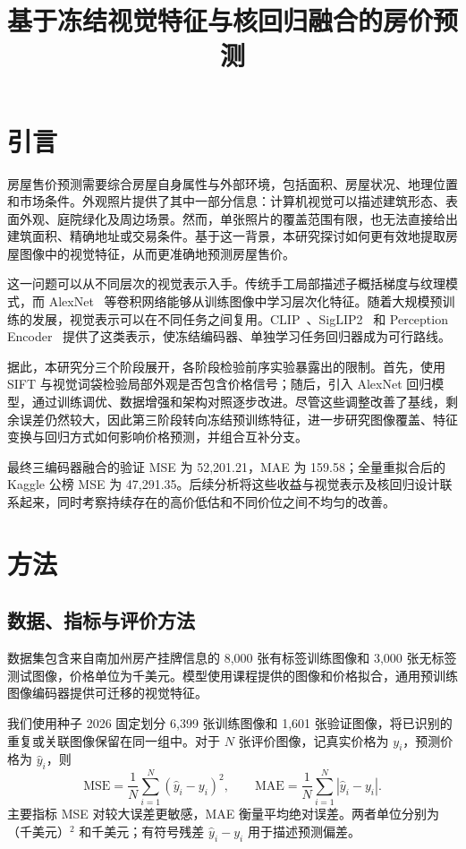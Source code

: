 \documentclass[conference,a4paper]{IEEEtran}
\title{基于冻结视觉特征与核回归融合的房价预测}
\author{\IEEEauthorblockN{Shifeng Chen \qquad Haoxuan Ying}
\IEEEauthorblockA{1686631 \qquad 1255329\\
墨尔本大学，COMP90086 计算机视觉}}
\begin{document}
\maketitle
\raggedbottom

\section{引言}
房屋售价预测需要综合房屋自身属性与外部环境，包括面积、房屋状况、地理位置和市场条件。外观照片提供了其中一部分信息：计算机视觉可以描述建筑形态、表面外观、庭院绿化及周边场景。然而，单张照片的覆盖范围有限，也无法直接给出建筑面积、精确地址或交易条件。基于这一背景，本研究探讨如何更有效地提取房屋图像中的视觉特征，从而更准确地预测房屋售价。

这一问题可以从不同层次的视觉表示入手。传统手工局部描述子概括梯度与纹理模式，而 AlexNet~\cite{alexnet} 等卷积网络能够从训练图像中学习层次化特征。随着大规模预训练的发展，视觉表示可以在不同任务之间复用。CLIP~\cite{clip}、SigLIP2~\cite{siglip2} 和 Perception Encoder~\cite{pe} 提供了这类表示，使冻结编码器、单独学习任务回归器成为可行路线。

据此，本研究分三个阶段展开，各阶段检验前序实验暴露出的限制。首先，使用 SIFT 与视觉词袋检验局部外观是否包含价格信号；随后，引入 AlexNet 回归模型，通过训练调优、数据增强和架构对照逐步改进。尽管这些调整改善了基线，剩余误差仍然较大，因此第三阶段转向冻结预训练特征，进一步研究图像覆盖、特征变换与回归方式如何影响价格预测，并组合互补分支。

最终三编码器融合的验证 MSE 为 52,201.21，MAE 为 159.58；全量重拟合后的 Kaggle 公榜 MSE 为 47,291.35。后续分析将这些收益与视觉表示及核回归设计联系起来，同时考察持续存在的高价低估和不同价位之间不均匀的改善。

\section{方法}
\subsection{数据、指标与评价方法}
数据集包含来自南加州房产挂牌信息的 8,000 张有标签训练图像和 3,000 张无标签测试图像，价格单位为千美元。模型使用课程提供的图像和价格拟合，通用预训练图像编码器提供可迁移的视觉特征。

我们使用种子 2026 固定划分 6,399 张训练图像和 1,601 张验证图像，将已识别的重复或关联图像保留在同一组中。对于 $N$ 张评价图像，记真实价格为 $y_i$，预测价格为 $\hat y_i$，则
\begin{equation}
\mathrm{MSE}=\frac{1}{N}\sum_{i=1}^{N}(\hat y_i-y_i)^2,\qquad
\mathrm{MAE}=\frac{1}{N}\sum_{i=1}^{N}|\hat y_i-y_i|.
\end{equation}
主要指标 MSE 对较大误差更敏感，MAE 衡量平均绝对误差。两者单位分别为（千美元）$^2$ 和千美元；有符号残差 $\hat y_i-y_i$ 用于描述预测偏差。
\end{document}
